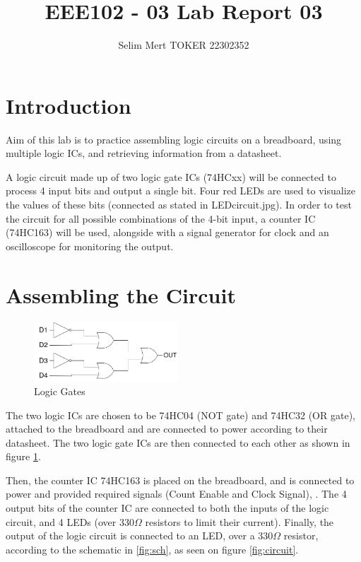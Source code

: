 \documentclass[a4paper, 12pt]{article}
\title{\Large EEE102 - 03 \qquad Lab Report 03\\ \small \hrulefill}
\date{}
\author{Selim Mert TOKER 22302352}
\begin{document}
\maketitle

\section{Introduction}

Aim of this lab is to practice assembling logic circuits on a breadboard, using multiple logic ICs, and retrieving information from a datasheet.


A logic circuit made up of two logic gate ICs (74HCxx) will be connected to process 4 input bits and output a single bit.
Four red LEDs are used to visualize the values of these bits (connected as stated in LEDcircuit.jpg).
In order to test the circuit for all possible combinations of the 4-bit input, a counter IC (74HC163) will be used, alongside with a signal generator for clock and an oscilloscope for monitoring the output.

\section{Assembling the Circuit}

\begin{figure}
	\centering
	\includegraphics[width=0.48\textwidth]{diagram.png}
	\caption{Logic Gates}
	\label{fig:diagram}
\end{figure}

The two logic ICs are chosen to be 74HC04 (NOT gate) and 74HC32 (OR gate), attached to the breadboard and are connected to power according to their datasheet.
The two logic gate ICs are then connected to each other as shown in figure \ref{fig:diagram}.

Then, the counter IC 74HC163 is placed on the breadboard, and is connected to power and provided required signals (Count Enable and Clock Signal), .
The 4 output bits of the counter IC are connected to both the inputs of the logic circuit, and 4 LEDs (over 330$\Omega$ resistors to limit their current).
Finally, the output of the logic circuit is connected to an LED, over a 330$\Omega$ resistor, according to the schematic in \ref{fig:sch}, as seen on figure \ref{fig:circuit}.
\end{document}

